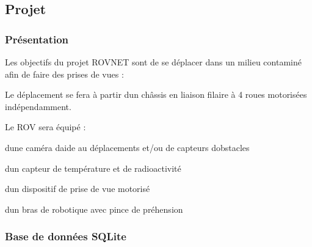 \hypertarget{page__r_e_a_d_m_e_projet}{}\subsection{Projet}\label{page__r_e_a_d_m_e_projet}
\hypertarget{page__r_e_a_d_m_e_presentation}{}\subsubsection{Présentation}\label{page__r_e_a_d_m_e_presentation}
Les objectifs du projet R\+OV\textquotesingle{}N\+ET sont de se déplacer dans un milieu contaminé afin de faire des prises de vues \+:


\begin{DoxyItemize}
\item Le déplacement se fera à partir d\textquotesingle{}un châssis en liaison filaire​ à 4 roues motorisées indépendamment.
\item Le R\+OV sera équipé \+:
\begin{DoxyItemize}
\item d\textquotesingle{}une caméra d\textquotesingle{}aide au déplacements et/ou de capteurs d\textquotesingle{}obstacles
\item d\textquotesingle{}un capteur de température et de radioactivité
\item d\textquotesingle{}un dispositif de prise de vue motorisé
\item d\textquotesingle{}un bras de robotique avec pince de préhension
\end{DoxyItemize}
\end{DoxyItemize}\hypertarget{page__r_e_a_d_m_e_bdd}{}\subsubsection{Base de données S\+Q\+Lite}\label{page__r_e_a_d_m_e_bdd}



